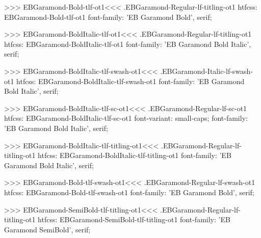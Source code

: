 {{{{{{{>>>
\<EBGaramond-Bold-tlf-ot1\><<<
.EBGaramond-Regular-lf-titling-ot1
htfcss:  EBGaramond-Bold-tlf-ot1  font-family: 'EB Garamond Bold', serif;

>>>
\<EBGaramond-BoldItalic-tlf-ot1\><<<
.EBGaramond-Regular-lf-titling-ot1
htfcss:  EBGaramond-BoldItalic-tlf-ot1  font-family: 'EB Garamond Bold Italic', serif;

>>>
\<EBGaramond-BoldItalic-tlf-swash-ot1\><<<
.EBGaramond-Italic-lf-swash-ot1
htfcss:  EBGaramond-BoldItalic-tlf-swash-ot1  font-family: 'EB Garamond Bold Italic', serif;

>>>
\<EBGaramond-BoldItalic-tlf-sc-ot1\><<<
.EBGaramond-Regular-lf-sc-ot1
htfcss:  EBGaramond-BoldItalic-tlf-sc-ot1  font-variant: small-caps; font-family: 'EB Garamond Bold Italic', serif;

>>>
\<EBGaramond-BoldItalic-tlf-titling-ot1\><<<
.EBGaramond-Regular-lf-titling-ot1
htfcss:  EBGaramond-BoldItalic-tlf-titling-ot1  font-family: 'EB Garamond Bold Italic', serif;

>>>
\<EBGaramond-Bold-tlf-swash-ot1\><<<
.EBGaramond-Regular-lf-swash-ot1
htfcss:  EBGaramond-Bold-tlf-swash-ot1  font-family: 'EB Garamond Bold', serif;

>>>
\<EBGaramond-SemiBold-tlf-titling-ot1\><<<
.EBGaramond-Regular-lf-titling-ot1
htfcss:  EBGaramond-SemiBold-tlf-titling-ot1  font-family: 'EB Garamond SemiBold', serif;

}}}}}}}
